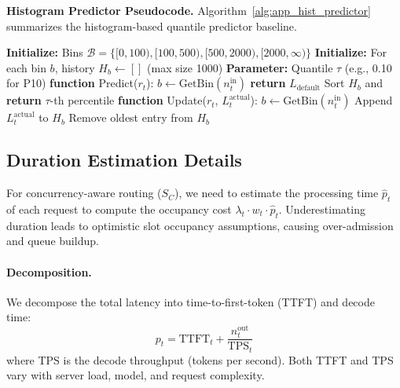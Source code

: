 \noindent\textbf{Histogram Predictor Pseudocode.} Algorithm~\ref{alg:app_hist_predictor} summarizes the histogram-based quantile predictor baseline.

\begin{algorithm}[H]
\caption{Histogram-based Quantile Predictor}
\label{alg:app_hist_predictor}
\begin{algorithmic}
\STATE \textbf{Initialize:} Bins $\mathcal{B} = \{[0, 100), [100, 500), [500, 2000), [2000, \infty)\}$
\STATE \textbf{Initialize:} For each bin $b$, history $H_b \gets []$ (max size 1000)
\STATE \textbf{Parameter:} Quantile $\tau$ (e.g., 0.10 for P10)
\STATE \textbf{function} Predict($r_t$):
\STATE \quad $b \gets \text{GetBin}(n_t^{\text{in}})$
    \STATE \quad \textbf{return} $L_{\text{default}}$
\ENDIF
\STATE \quad Sort $H_b$ and \textbf{return} $\tau$-th percentile
\STATE \textbf{function} Update($r_t$, $L_t^{\text{actual}}$):
\STATE \quad $b \gets \text{GetBin}(n_t^{\text{in}})$
\STATE \quad Append $L_t^{\text{actual}}$ to $H_b$
    \STATE \quad Remove oldest entry from $H_b$
\ENDIF
\end{algorithmic}
\end{algorithm}

\subsection{Duration Estimation Details}
\label{app:duration}

For concurrency-aware routing ($S_C$), we need to estimate the processing time $\hat{p}_t$ of each request to compute the occupancy cost $\lambda_t \cdot w_t \cdot \hat{p}_t$. Underestimating duration leads to optimistic slot occupancy assumptions, causing over-admission and queue buildup.

\paragraph{Decomposition.} We decompose the total latency into time-to-first-token (TTFT) and decode time:
\begin{equation}
    p_t = \text{TTFT}_t + \frac{n_t^{\text{out}}}{\text{TPS}_t}
\end{equation}
where TPS is the decode throughput (tokens per second). Both TTFT and TPS vary with server load, model, and request complexity.

